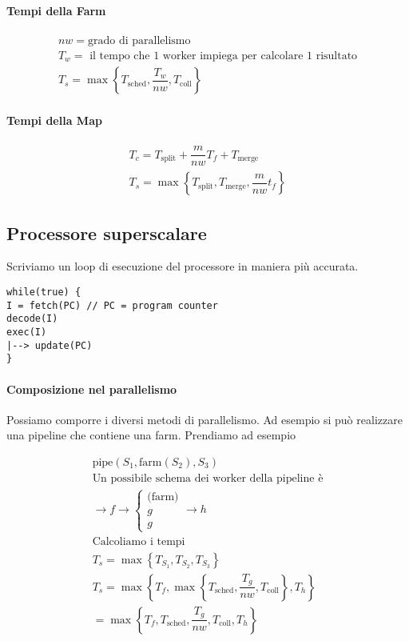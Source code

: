 \paragraph{Tempi della Farm}
\[ \begin{aligned}
nw = \text{grado di parallelismo}\\
T_w = \text{ il tempo che 1 worker impiega per calcolare 1 risultato} \\
T_s = \max\left\{T_{\text{sched}}, \dfrac{T_w}{nw}, T_{\text{coll}}\right\}
\end{aligned} \]

\paragraph{Tempi della Map}
\[ \begin{aligned}
T_c = T_\text{split} + \dfrac{m}{nw} T_f + T_\text{merge} \\
T_s = \max\left\{T_\text{split}, T_\text{merge}, \dfrac{m}{nw}t_f\right\}
\end{aligned} \]

\subsection{Processore superscalare}

Scriviamo un loop di esecuzione del processore in maniera più accurata.

\begin{lstlisting}[frame=single]
while(true) {
I = fetch(PC) // PC = program counter
decode(I)
exec(I)
|--> update(PC)
}
\end{lstlisting}



\paragraph{Composizione nel parallelismo}

Possiamo comporre i diversi metodi di parallelismo. Ad esempio si può realizzare
una pipeline che contiene una farm. Prendiamo ad esempio

\[ \begin{aligned}
\text{pipe}(S_1, \text{farm}(S_2), S_3) \\
\text{Un possibile schema dei worker della pipeline è} \\
\to f \to \begin{cases}
\text{(farm)} \\
g \\ g \end{cases} \to h \\
\text{Calcoliamo i tempi} \\
T_s = \max\left\{T_{S_1}, T_{S_2}, T_{S_3}\right\} \\
T_s = \max\left\{T_f, \max\left\{T_\text{sched}, \dfrac{T_g}{nw},
T_\text{coll}\right\}, T_h \right\} \\
= \max\left\{T_f, T_\text{sched}, \dfrac{T_g}{nw}, T_\text{coll}, T_h \right\}
\end{aligned} \]

